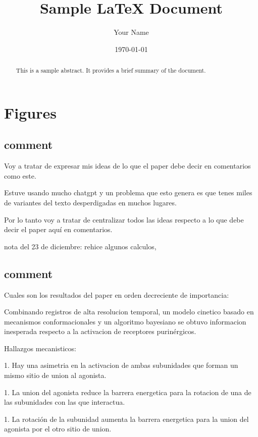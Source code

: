 \documentclass[a4paper,12pt]{article}
\title{Sample LaTeX Document}
\author{Your Name}
\date{\today}  %
\begin{document}
	
	\maketitle
	
	\begin{abstract}
		This is a sample abstract. It provides a brief summary of the document.
	\end{abstract}
	
	
	\section{Figures}

	
	\subsection{comment}
		Voy a tratar de expresar mis ideas de lo que el paper debe decir en comentarios como este. 
		
		Estuve usando mucho chatgpt y un problema que esto genera es que tenes miles de variantes del texto desperdigadas en muchos lugares. 
		
		Por lo tanto voy a tratar de centralizar todos las ideas respecto a lo que debe decir el paper aquí en comentarios. 
		
		nota del 23 de diciembre: 
		rehice algunos calculos, 
		
	
	
	
	\subsection{comment}
		Cuales son los resultados del paper en orden decreciente de importancia:
		
		
		Combinando registros de alta resolucion temporal, un modelo cinetico basado en mecanismos conformacionales y un algoritmo bayesiano se obtuvo informacion inesperada respecto a la activacion de receptores purinérgicos. 
		
		Hallazgos mecanisticos: 
		
		1. Hay una asimetria en la activacion de ambas subunidades que forman un mismo sitio de union al agonista. 
		
		1. La union del agonista reduce la barrera energetica para la rotacion de una de las subunidades con las que interactua. 
		
		1. La rotación de la subunidad aumenta la barrera energetica para la union del agonista por el otro sitio de union. 
		
		
		
\end{document}
